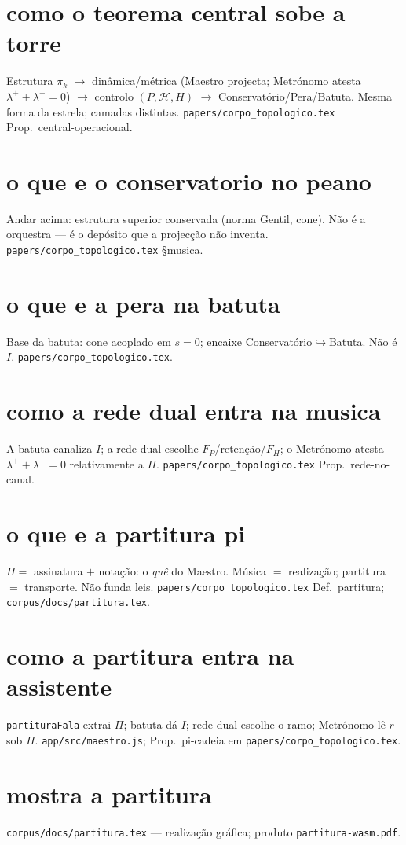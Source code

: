 \documentclass[11pt,a4paper]{article}
\newcommand{\code}[1]{\texttt{\small #1}}
\begin{document}
\section{como o teorema central sobe a torre}
Estrutura $\pi_k$ $\to$ dinâmica/métrica (Maestro projecta; Metrónomo
atesta $\lambda^{+}+\lambda^{-}=0$) $\to$ controlo $(P,\mathcal{H},H)$
$\to$ Conservatório/Pera/Batuta.
Mesma forma da estrela; camadas distintas.
\code{papers/corpo\_topologico.tex} Prop.\ central-operacional.

\section{o que e o conservatorio no peano}
Andar acima: estrutura superior conservada (norma Gentil, cone).
Não é a orquestra --- é o depósito que a projecção não inventa.
\code{papers/corpo\_topologico.tex} \S musica.

\section{o que e a pera na batuta}
Base da batuta: cone acoplado em $s=0$; encaixe
Conservatório$\hookrightarrow$Batuta. Não é $I$.
\code{papers/corpo\_topologico.tex}.

\section{como a rede dual entra na musica}
A batuta canaliza $I$; a rede dual escolhe $F_P$/retenção/$F_H$;
o Metrónomo atesta $\lambda^{+}+\lambda^{-}=0$ relativamente a $\Pi$.
\code{papers/corpo\_topologico.tex} Prop.\ rede-no-canal.

\section{o que e a partitura pi}
$\Pi=$ assinatura $+$ notação: o \emph{quê} do Maestro.
Música $=$ realização; partitura $=$ transporte. Não funda leis.
\code{papers/corpo\_topologico.tex} Def.\ partitura; \code{corpus/docs/partitura.tex}.

\section{como a partitura entra na assistente}
\code{partituraFala} extrai $\Pi$; batuta dá $I$; rede dual escolhe o ramo;
Metrónomo lê $r$ sob $\Pi$.
\code{app/src/maestro.js}; Prop.\ pi-cadeia em \code{papers/corpo\_topologico.tex}.

\section{mostra a partitura}
\code{corpus/docs/partitura.tex} --- realização gráfica; produto
\code{partitura-wasm.pdf}.
\end{document}
